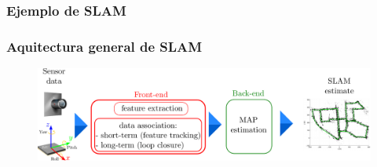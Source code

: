 \begin{frame}
    \frametitle{Ejemplo de SLAM}
    
    \begin{figure}
        \hfill{}
    \end{figure}
    
\end{frame}

\begin{frame}
    \frametitle{Aquitectura general de SLAM}
    
    \begin{figure}[!h]
            \includegraphics[width=\textwidth]{images/slam_frontend_backend.pdf}
    \end{figure}
    
\end{frame}


